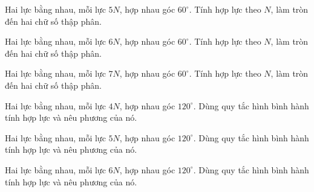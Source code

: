 \begin{ex}
Hai lực bằng nhau, mỗi lực $5N$, hợp nhau góc $60^\circ$. Tính hợp lực theo $N$, làm tròn đến hai chữ số thập phân.
\end{ex}

\begin{ex}
Hai lực bằng nhau, mỗi lực $6N$, hợp nhau góc $60^\circ$. Tính hợp lực theo $N$, làm tròn đến hai chữ số thập phân.
\end{ex}

\begin{ex}
Hai lực bằng nhau, mỗi lực $7N$, hợp nhau góc $60^\circ$. Tính hợp lực theo $N$, làm tròn đến hai chữ số thập phân.
\end{ex}

\begin{bt}
Hai lực bằng nhau, mỗi lực $4N$, hợp nhau góc $120^\circ$. Dùng quy tắc hình bình hành tính hợp lực và nêu phương của nó.
\end{bt}

\begin{bt}
Hai lực bằng nhau, mỗi lực $5N$, hợp nhau góc $120^\circ$. Dùng quy tắc hình bình hành tính hợp lực và nêu phương của nó.
\end{bt}

\begin{bt}
Hai lực bằng nhau, mỗi lực $6N$, hợp nhau góc $120^\circ$. Dùng quy tắc hình bình hành tính hợp lực và nêu phương của nó.
\end{bt}

